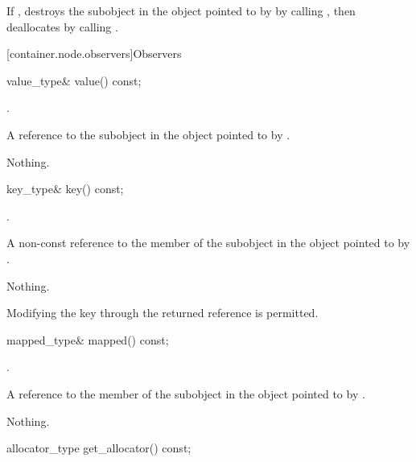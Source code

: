 \begin{itemdescr}
\pnum
\effects
If , destroys the  subobject
in the  object pointed to by  by calling
, then deallocates  by calling
.
\end{itemdescr}

[container.node.observers]{Observers}

\begin{itemdecl}
value_type& value() const;
\end{itemdecl}

\begin{itemdescr}
\pnum
\expects
{}.

\pnum
\returns
A reference to the  subobject in the
 object pointed to by .

\pnum
\throws
Nothing.
\end{itemdescr}

\begin{itemdecl}
key_type& key() const;
\end{itemdecl}

\begin{itemdescr}
\pnum
\expects
{}.

\pnum
\returns
A non-const reference to the  member of the
 subobject in the  object
pointed to by .

\pnum
\throws
Nothing.

\pnum
\remarks
Modifying the key through the returned reference is permitted.
\end{itemdescr}

\begin{itemdecl}
mapped_type& mapped() const;
\end{itemdecl}

\begin{itemdescr}
\pnum
\expects
{}.

\pnum
\returns
A reference to the  member of the
 subobject in the  object
pointed to by .

\pnum
\throws
Nothing.
\end{itemdescr}


\begin{itemdecl}
allocator_type get_allocator() const;
\end{itemdecl}

